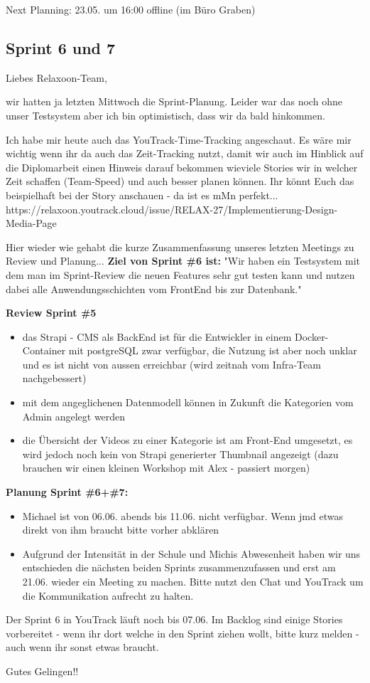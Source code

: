 Next Planning: 23.05. um 16:00 offline (im Büro Graben)

\subsection{Sprint 6 und 7}

Liebes Relaxoon-Team,

wir hatten ja letzten Mittwoch die Sprint-Planung.
Leider war das noch ohne unser Testsystem aber ich bin optimistisch, dass wir da bald hinkommen.

Ich habe mir heute auch das YouTrack-Time-Tracking angeschaut. Es wäre mir wichtig wenn ihr da auch das Zeit-Tracking nutzt, damit wir auch im Hinblick auf die Diplomarbeit einen Hinweis darauf bekommen wieviele Stories wir in welcher Zeit schaffen (Team-Speed) und auch besser planen können.
Ihr könnt Euch das beispielhaft bei der Story anschauen - da ist es mMn perfekt...
https://relaxoon.youtrack.cloud/issue/RELAX-27/Implementierung-Design-Media-Page

Hier wieder wie gehabt die kurze Zusammenfassung unseres letzten Meetings zu Review und Planung...
\textbf{Ziel von Sprint \#6 ist:} "Wir haben ein Testsystem mit dem man im Sprint-Review die neuen Features sehr gut testen kann und nutzen dabei alle Anwendungsschichten vom FrontEnd bis zur Datenbank."


\textbf{Review Sprint \#5}
\newline

\begin{itemize}
    \item das Strapi - CMS als BackEnd ist für die Entwickler in einem Docker-Container mit postgreSQL zwar verfügbar, die Nutzung ist aber noch unklar und es ist nicht von aussen erreichbar (wird zeitnah vom Infra-Team nachgebessert)
    \item mit dem angeglichenen Datenmodell können in Zukunft die Kategorien vom Admin angelegt werden
    \item die Übersicht der Videos zu einer Kategorie ist am Front-End umgesetzt, es wird jedoch noch kein von Strapi generierter Thumbnail angezeigt (dazu brauchen wir einen kleinen Workshop mit Alex - passiert morgen)

\end{itemize}

\textbf{Planung Sprint \#6+\#7:}
\newline

\begin{itemize}
    \item Michael ist von 06.06. abends bis 11.06. nicht verfügbar. Wenn jmd etwas direkt von ihm braucht bitte vorher abklären
    \item  Aufgrund der Intensität in der Schule und Michis Abwesenheit haben wir uns entschieden die nächsten beiden Sprints zusammenzufassen und erst am 21.06. wieder ein Meeting zu machen. Bitte nutzt den Chat und YouTrack um die Kommunikation aufrecht zu halten.

\end{itemize}

Der Sprint 6 in YouTrack läuft noch bis 07.06.
Im Backlog sind einige Stories vorbereitet - wenn ihr dort welche in den Sprint ziehen wollt, bitte kurz melden - auch wenn ihr sonst etwas braucht.

Gutes Gelingen!!

